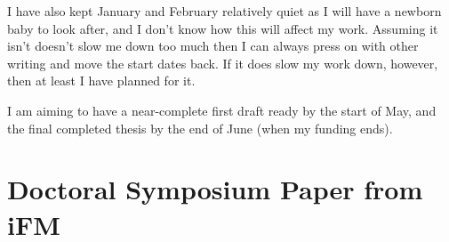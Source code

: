 \documentclass[a4paper]{scrartcl}
\begin{document}
I have also kept January and February relatively quiet as I will have a newborn baby to
look after, and I don't know how this will affect my work. Assuming it isn't
doesn't slow me down too much then I can always press on with other writing and
move the start dates back.  If it does slow my work down, however, then at least
I have planned for it.

I am aiming to have a near-complete first draft ready by the start of May, and
the final completed thesis by the end of June (when my funding ends).

\pagebreak
\section{Doctoral Symposium Paper from iFM}

\end{document}
